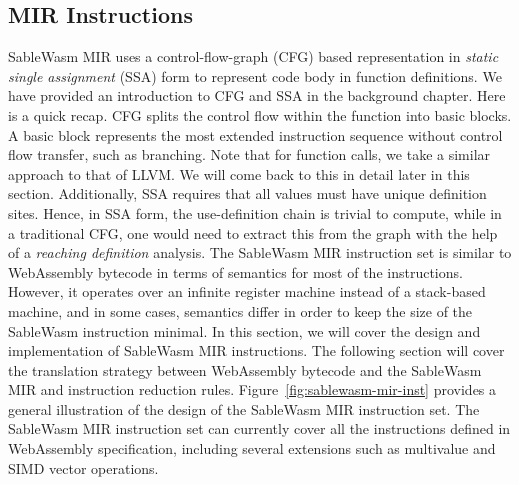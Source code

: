 \subsection{MIR Instructions}

SableWasm MIR uses a control-flow-graph (CFG) based representation in
\emph{static single assignment} (SSA) form to represent code body in function
definitions. We have provided an introduction to CFG and SSA in the background
chapter. Here is a quick recap. CFG splits the control flow within the function
into basic blocks. A basic block represents the most extended instruction
sequence without control flow transfer, such as branching. Note that for
function calls, we take a similar approach to that of LLVM. We will come back
to this in detail later in this section. Additionally, SSA requires that all
values must have unique definition sites. Hence, in SSA form, the
use-definition chain is trivial to compute, while in a traditional CFG, one
would need to extract this from the graph with the help of a \emph{reaching
  definition} analysis. The SableWasm MIR instruction set is similar to
WebAssembly bytecode in terms of semantics for most of the instructions.
However, it operates over an infinite register machine instead of a
stack-based machine, and in some cases, semantics differ in order to keep the
size of the SableWasm instruction minimal. In this section, we will cover the
design and implementation of SableWasm MIR instructions. The following section
will cover the translation strategy between WebAssembly bytecode and the
SableWasm MIR and instruction reduction rules.
Figure~\ref{fig:sablewasm-mir-inst} provides a general illustration of the
design of the SableWasm MIR instruction set. The SableWasm MIR instruction set
can currently cover all the instructions defined in WebAssembly specification,
including several extensions such as multivalue and SIMD vector operations.

